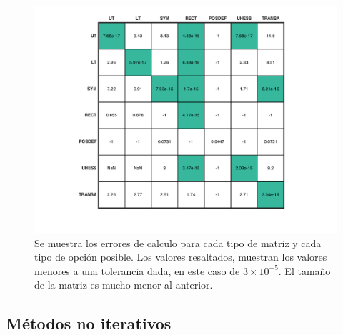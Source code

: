 \documentclass[11pt, spanish]{article}
\begin{document}
\begin{enumerate}
\begin{figure}[h]
\centering
	\includegraphics[scale=0.8]{data/img/plotlinear_errorsmall}
	\caption{Se muestra los errores de calculo para cada tipo de matriz y cada tipo de opción posible. Los valores resaltados, muestran los valores menores a una tolerancia dada, en este caso de $3\times 10 ^{-5}$. El tamaño de la matriz es mucho menor al anterior.}
\end{figure}

\end{enumerate}

\subsection{Métodos no iterativos}
\end{document}
